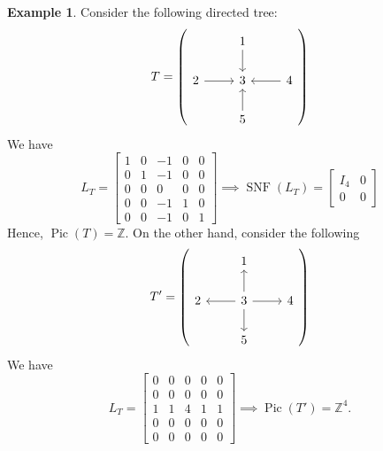 \documentclass[11pt,reqno]{amsart}
\DeclareMathOperator{\Pic}{Pic}
\DeclareMathOperator{\snf}{SNF}
\theoremstyle{definition}
\newtheorem{myeg}[mydef]{Example}
\theoremstyle{plain}
\begin{document}
\begin{myeg}\label{example: tree four}
Consider the following directed tree:
\begin{equation}\label{eq: tree4}
T=\left(\begin{tikzcd}
	& 1 \arrow[d] & \\
2 \arrow[r]& 3 & 4 \arrow[l]\\
& 5 \arrow[u] &
\end{tikzcd} \right)
\end{equation}
We have
\[
L_T = \begin{bmatrix}
 1& 0& -1&0 &0 \\
 0 & 1 & -1 & 0 &0\\
 0& 0& 0& 0 &0\\
 0& 0&-1&1 & 0\\
 0& 0&-1&0 & 1
\end{bmatrix} \implies \snf(L_T)=\left[\begin{array}{c|c}
I_4 & 0 \\ \hline
0 & 0
\end{array}\right]
\]
Hence, $\Pic(T)=\mathbb{Z}$. On the other hand, consider the following
\begin{equation}
T'=\left(\begin{tikzcd}
		& 1 & \\
		2 & 3 \arrow[u] \arrow[r]\arrow[l] \arrow[d]& 4 \\
		& 5  &
	\end{tikzcd} \right)
\end{equation}
We have
\[
L_T = \begin{bmatrix}
	0& 0& 0&0 &0 \\
	0 & 0 & 0 & 0 &0\\
	1& 1& 4& 1 &1\\
	0& 0&0&0 & 0\\
	0& 0&0&0 & 0
\end{bmatrix} \implies \Pic(T')=\mathbb{Z}^4.
\]
\end{myeg}
\end{document}
